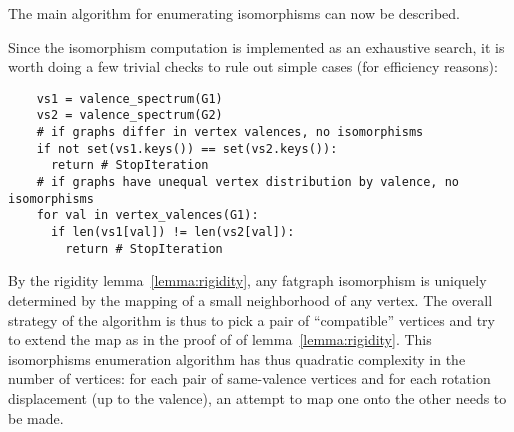 The main algorithm for enumerating isomorphisms can now be described.

Since the isomorphism computation is implemented as an exhaustive
search, it is worth doing a few trivial checks to rule out simple
cases (for efficiency reasons):
\begin{lstlisting}
    vs1 = valence_spectrum(G1)
    vs2 = valence_spectrum(G2)
    # if graphs differ in vertex valences, no isomorphisms
    if not set(vs1.keys()) == set(vs2.keys()):
      return # StopIteration
    # if graphs have unequal vertex distribution by valence, no isomorphisms
    for val in vertex_valences(G1):
      if len(vs1[val]) != len(vs2[val]):
        return # StopIteration

\end{lstlisting}

By the rigidity lemma~\ref{lemma:rigidity}, any fatgraph isomorphism
is uniquely determined by the mapping of a small neighborhood of any
vertex.  The overall strategy of the algorithm is thus to pick a pair
of ``compatible'' vertices and try to extend the map as in the proof
of of lemma~\ref{lemma:rigidity}.  This isomorphisms enumeration
algorithm has thus quadratic complexity in the number of
vertices: for each pair of same-valence vertices and for each
rotation displacement (up to the valence), an attempt to map one onto
the other needs to be made.  

